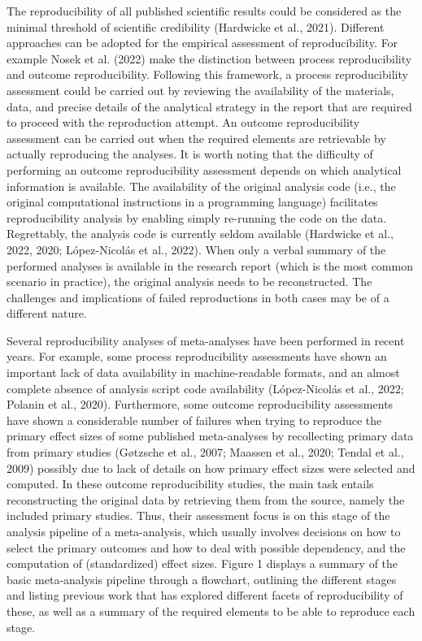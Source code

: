 \documentclass[
  ,apa7,floatsintext]{apa6}
\begin{document}
The reproducibility of all published scientific results could be considered as the minimal threshold of scientific credibility (Hardwicke et al., 2021). Different approaches can be adopted for the empirical assessment of reproducibility. For example Nosek et al. (2022) make the distinction between process reproducibility and outcome reproducibility. Following this framework, a process reproducibility assessment could be carried out by reviewing the availability of the materials, data, and precise details of the analytical strategy in the report that are required to proceed with the reproduction attempt. An outcome reproducibility assessment can be carried out when the required elements are retrievable by actually reproducing the analyses. It is worth noting that the difficulty of performing an outcome reproducibility assessment depends on which analytical information is available. The availability of the original analysis code (i.e., the original computational instructions in a programming language) facilitates reproducibility analysis by enabling simply re-running the code on the data. Regrettably, the analysis code is currently seldom available (Hardwicke et al., 2022, 2020; López-Nicolás et al., 2022). When only a verbal summary of the performed analyses is available in the research report (which is the most common scenario in practice), the original analysis needs to be reconstructed. The challenges and implications of failed reproductions in both cases may be of a different nature.

Several reproducibility analyses of meta-analyses have been performed in recent years. For example, some process reproducibility assessments have shown an important lack of data availability in machine-readable formats, and an almost complete absence of analysis script code availability (López-Nicolás et al., 2022; Polanin et al., 2020). Furthermore, some outcome reproducibility assessments have shown a considerable number of failures when trying to reproduce the primary effect sizes of some published meta-analyses by recollecting primary data from primary studies (Gøtzsche et al., 2007; Maassen et al., 2020; Tendal et al., 2009) possibly due to lack of details on how primary effect sizes were selected and computed. In these outcome reproducibility studies, the main task entails reconstructing the original data by retrieving them from the source, namely the included primary studies. Thus, their assessment focus is on this stage of the analysis pipeline of a meta-analysis, which usually involves decisions on how to select the primary outcomes and how to deal with possible dependency, and the computation of (standardized) effect sizes. Figure 1 displays a summary of the basic meta-analysis pipeline through a flowchart, outlining the different stages and listing previous work that has explored different facets of reproducibility of these, as well as a summary of the required elements to be able to reproduce each stage.
\end{document}
